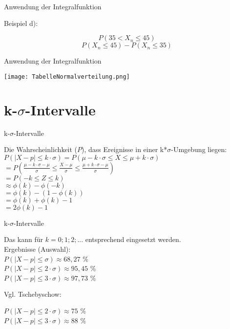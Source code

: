 \documentclass[14pt]{beamer}
\begin{document}
\begin{frame} {Anwendung der Integralfunktion}

Beispiel d):
 
 $$P(35 < X_n \le 45)$$
 $$P(X_n \le 45) - P(X_n \le 35)$$

\end{frame}

\begin{frame} {Anwendung der Integralfunktion}
 
 \texttt{[image: TabelleNormalverteilung.png]}

\end{frame}

\section{k-$\sigma$-Intervalle}

\begin{frame}{k-$\sigma$-Intervalle}

Die Wahrscheinlichkeit ($P$), dass Ereignisse in einer k*$\sigma$-Umgebung liegen:
$ P(|X-p|\le k\cdot\sigma) = P(\mu-k\cdot\sigma\le X \le \mu + k\cdot\sigma)$\\
$ = P\left(\frac{\mu-k\cdot\sigma - \mu}{\sigma}\le \frac{X - \mu}{\sigma}\le \frac{\mu + k\cdot\sigma - \mu}{\sigma}\right)$\\
$ = P(-k \le Z \le k)$\\
$ \approx \phi(k) - \phi(-k)$\\
$ = \phi(k) - (1 - \phi(k))$\\
$ = \phi(k) + \phi(k) - 1$\\
$ = 2\phi(k)- 1$\\

\end{frame}

\begin{frame}{k-$\sigma$-Intervalle}

Das kann für $ k = {0;1;2;...}$ entsprechend eingesetzt werden.
 \\
Ergebnisse (Auswahl):
 \\
$ P(|X-p|\le \sigma) \approx 68,27$ \%\\
$ P(|X-p|\le 2\cdot\sigma) \approx 95,45$ \%\\
$ P(|X-p|\le 3\cdot\sigma) \approx 97,73$ \%

Vgl. Tschebyschow:

$ P(|X-p|\le 2\cdot\sigma) \approx 75$ \%\\
$ P(|X-p|\le 3\cdot\sigma) \approx 88$ \%\\

\end{frame}
\end{document}
